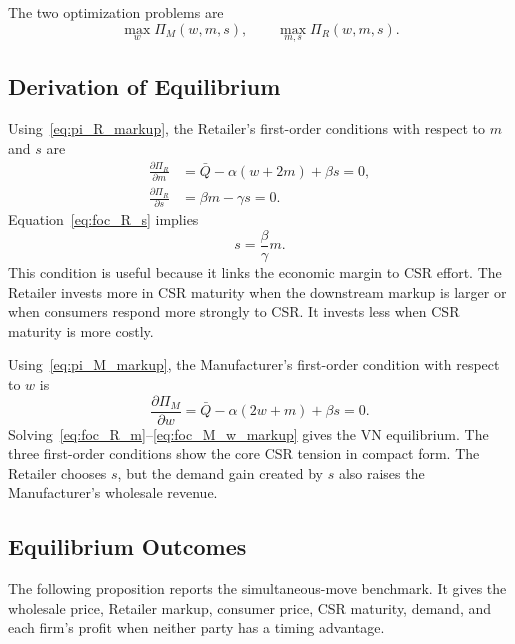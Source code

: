 The two optimization problems are
\begin{equation*}
    \max_w \Pi_M(w,m,s),
    \qquad
    \max_{m,s}\Pi_R(w,m,s).
\end{equation*}

\subsection{Derivation of Equilibrium}

Using~\eqref{eq:pi_R_markup}, the Retailer's first-order conditions with respect to $m$ and $s$ are
\begin{align}
    \frac{\partial \Pi_R}{\partial m}
    &=\bar{Q}-\alpha(w+2m)+\beta s=0,
    \label{eq:foc_R_m}\\
    \frac{\partial \Pi_R}{\partial s}
    &=\beta m-\gamma s=0.
    \label{eq:foc_R_s}
\end{align}
Equation~\eqref{eq:foc_R_s} implies
\begin{equation*}
    s=\frac{\beta}{\gamma}m.
\end{equation*}
This condition is useful because it links the economic margin to CSR effort. The Retailer invests more in CSR maturity when the downstream markup is larger or when consumers respond more strongly to CSR. It invests less when CSR maturity is more costly.

Using~\eqref{eq:pi_M_markup}, the Manufacturer's first-order condition with respect to $w$ is
\begin{equation}
    \frac{\partial \Pi_M}{\partial w}
    =\bar{Q}-\alpha(2w+m)+\beta s=0.
    \label{eq:foc_M_w_markup}
\end{equation}
Solving~\eqref{eq:foc_R_m}--\eqref{eq:foc_M_w_markup} gives the VN equilibrium. The three first-order conditions show the core CSR tension in compact form. The Retailer chooses $s$, but the demand gain created by $s$ also raises the Manufacturer's wholesale revenue.

\subsection{Equilibrium Outcomes}

The following proposition reports the simultaneous-move benchmark. It gives the wholesale price, Retailer markup, consumer price, CSR maturity, demand, and each firm's profit when neither party has a timing advantage.

